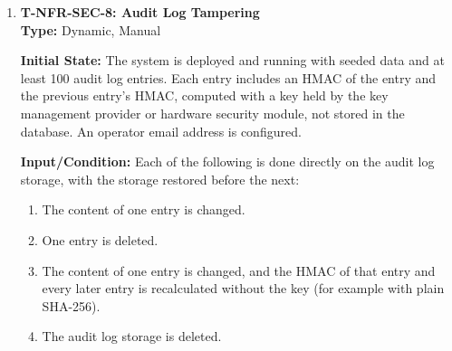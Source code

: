 \documentclass[12pt, titlepage]{article}
\providecommand{\descriptiveid}[1]{\texttt{\detokenize{#1}}}
\providecommand{\nfrref}[1]{\descriptiveid{#1}}
\newcommand{\auditSeedEntries}{100}
\begin{document}
\begin{enumerate}
\textbf{Type:} Dynamic, Automated

\textbf{Initial State:} The system is running with an empty database, except
for accounts for every role.

\textbf{Input/Condition:} Every type of approval decision, status change, and
role change is performed at least once, as each role that can perform it. The
audit log entries are then applied in order to a second database with the same
accounts and no other data. Once every user action is logged, the scenario is
extended to every type of user action.

\textbf{Output/Result:} The approval decisions, statuses, and roles in the
second database are equal to those in the first. Every log entry records its
time, the action, the affected record, the user, and the user's role at the
time of the action.

\textbf{How test will be performed:} Any code change on the main branch
triggers a GitHub Actions job that runs the backend against a PostgreSQL
database in Docker, performs the actions with a scripted scenario, and applies
the log entries with a replay script. The job compares the approval decisions,
statuses, and roles in both databases and records every difference found. The job is marked as failed if any
difference is found or any log entry is missing a required field.

\textbf{Relevant NFRs}: \nfrref{NFR_AuditLog}

\item \label{T-NFR-SEC-8}\textbf{T-NFR-SEC-8: Audit Log Tampering}\\

\textbf{Type:} Dynamic, Manual

\textbf{Initial State:} The system is deployed and running with seeded data
and at least \auditSeedEntries{} audit log entries. Each entry includes an HMAC of the entry
and the previous entry's HMAC, computed with a key held by the key management
provider or hardware security module, not stored in the database. An operator
email address is configured.

\textbf{Input/Condition:} Each of the following is done directly on the audit
log storage, with the storage restored before the next:
\begin{enumerate}
  \item The content of one entry is changed.
  \item One entry is deleted.
  \item The content of one entry is changed, and the HMAC of that entry and
  every later entry is recalculated without the key (for example with plain
  SHA-256).
  \item The audit log storage is deleted.
\end{enumerate}


\end{enumerate}
\end{document}
